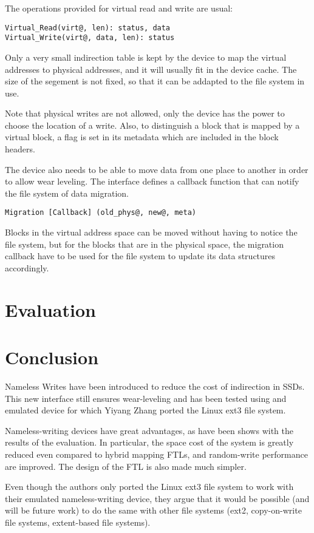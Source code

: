 \documentclass[twocolumn,a4paper,10pt]{article}
\begin{document}
The operations provided for virtual read and write are usual:
\begin{lstlisting}
Virtual_Read(virt@, len): status, data
Virtual_Write(virt@, data, len): status
\end{lstlisting}

Only a very small indirection table is kept by the device to map the virtual
addresses to physical addresses, and it will usually fit in the device cache.
The size of the segement is not fixed, so that it can be addapted to the file
system in use.

Note that physical writes are not allowed, only the device has the power to
choose the location of a write. Also, to distinguish a block that is mapped by
a virtual block, a flag is set in its metadata which are included in the block
headers.

The device also needs to be able to move data from one place to another in
order to allow wear leveling. The interface defines a callback function that
can notify the file system of data migration.
\begin{lstlisting}
Migration [Callback] (old_phys@, new@, meta)
\end{lstlisting}

Blocks in the virtual address space can be moved without having to notice the
file system, but for the blocks that are in the physical space, the migration
callback have to be used for the file system to update its data structures
accordingly.

\section*{Evaluation}

\section*{Conclusion}
Nameless Writes have been introduced to reduce the cost of indirection in
SSDs. This new interface still ensures wear-leveling and has been tested using
and emulated device for which Yiyang Zhang ported the Linux ext3 file system.

Nameless-writing devices have great advantages, as have been shows with the
results of the evaluation. In particular, the space cost of the system is
greatly reduced even compared to hybrid mapping FTLs, and random-write
performance are improved. The design of the FTL is also made much simpler.

Even though the authors only ported the Linux ext3 file system to work with
their emulated nameless-writing device, they argue that it would be possible
(and will be future work) to do the same with other file systems (ext2,
copy-on-write file systems, extent-based file systems).
\end{document}
